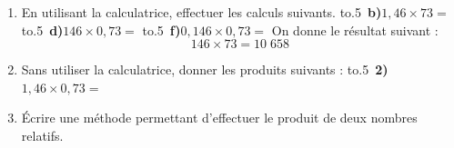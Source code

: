 \documentclass[activite]{thedocument}
\begin{document}
    \begin{enumerate}
        \item En utilisant la calculatrice, effectuer les calculs suivants.\vskip5pt
        \hbox{\hbox to.5\hbox{{\bfseries
        b)}\hskip10pt$1,46\times73=$\hfill}}\vskip10pt
        \hbox{\hbox to.5\hbox{{\bfseries
        d)}\hskip10pt$146\times0,73=$\hfill}}\vskip10pt
        \hbox{\hbox to.5\hbox{{\bfseries
        f)}\hskip10pt$0,146\times0,73=$\hfill}}
        \vskip10pt
        On donne le résultat suivant :$$146\times73=10\;658$$
        \item Sans utiliser la calculatrice, donner les produits suivants :\vskip5pt
        \hbox{\hbox to.5\hbox{{\bfseries
        2)}\hskip10pt$1,46\times0,73=$\hfill}}\vskip10pt
        \item Écrire une méthode permettant d'effectuer le produit de deux
        nombres relatifs.
        \dotedline\dotedline\dotedline
    \end{enumerate}
\end{document}
